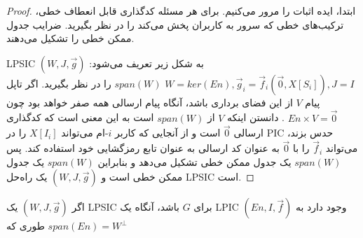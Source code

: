 \begin{proof}
    ابتدا، ایده اثبات را مرور می‌کنیم. برای هر مسئله کدگذاری قابل انعطاف خطی، ترکیب‌های خطی که سرور به کاربران پخش می‌کند را در نظر بگیرید. ضرایب جدول ممکن خطی را تشکیل می‌دهند.

    LPSIC 
    $(W, J, \overrightarrow{g})$
     به شکل زیر تعریف می‌شود: 
     $W = ker(En), \overrightarrow{g}_i = \overrightarrow{f}_i(\overrightarrow{0}, X[S_i]), J = I$
    $span(W)$
     را در نظر بگیرید. اگر تاپل پیام 
     $V$
      از این فضای برداری باشد، آنگاه پیام ارسالی همه صفر خواهد بود چون 
      $En \times V = \overrightarrow{0}$
      . دانستن اینکه 
      $V$ از $span(W)$
       است به این معنی است که کدگذاری ارسالی 
      $\overrightarrow{0}$
       است و از آنجایی که کاربر 
       $i$-ام
        می‌تواند 
       $X[I_i]$
        را در PIC حدس بزند، می‌تواند
         $\overrightarrow{f}_i$ 
        را با 
        $\overrightarrow{0}$ 
        به عنوان کد ارسالی به عنوان تابع رمزگشایی خود استفاده کند. پس 
        $span(W)$
         یک جدول ممکن خطی تشکیل می‌دهد و بنابراین 
        $span(W)$
         یک جدول ممکن خطی است و 
        $(W, J, \overrightarrow{g})$ 
        یک راه‌حل
         LPSIC 
        است.
\end{proof}

\begin{lemma}
    اگر
     $(W, J, \overrightarrow{g})$
      یک LPSIC برای $G$ باشد، آنگاه یک
       LPIC $(En, I, \overrightarrow{f})$
        وجود دارد به طوری که
         $span(En) = W^{\bot}$
\end{lemma}

